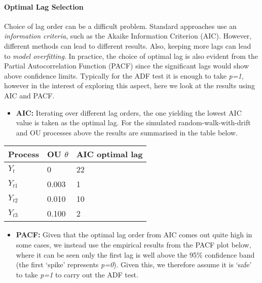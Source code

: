\documentclass[11pt]{article}
\providecommand{\tightlist}{%
      \setlength{\itemsep}{0pt}\setlength{\parskip}{0pt}}
\begin{document}
    \paragraph{Optimal Lag Selection}\label{optimal-lag-selection}
    
    
Choice of lag order can be a difficult problem. Standard approaches use
an \emph{information criteria}, such as the Akaike Information Criterion
(AIC). However, different methods can lead to different results. Also,
keeping more lags can lead to \emph{model overfitting}. In practice, the
choice of optimal lag is also evident from the
Partial Autocorrelation Function \cite{PartialAutocorrelationFunction} (PACF) since the significant lags would show
above confidence limits.
Typically for the ADF test it is enough to take \emph{p=1}, however in
the interest of exploring this aspect, here we look at the results using
AIC and PACF.
\begin{itemize}
\tightlist
\item
  \textbf{AIC:} Iterating over different lag orders, the one yielding
  the lowest AIC value is taken as the optimal lag. For the simulated
  random-walk-with-drift and OU processes above the results are
  summarised in the table below.
\end{itemize}
    \begin{longtable}[]{@{}lll@{}}
\toprule
Process & OU $\theta$ & AIC optimal lag\tabularnewline
\midrule
\endhead
$Y_{t}$ & 0 & 22\tabularnewline
$Y_{t1}$ & 0.003 & 1\tabularnewline
$Y_{t2}$ & 0.010 & 10\tabularnewline
$Y_{t3}$ & 0.100 & 2\tabularnewline
\bottomrule
\end{longtable}
    \begin{itemize}
\tightlist
\item
  \textbf{PACF:} Given that the optimal lag order from AIC comes out
  quite high in some cases, we instead use the
  empirical results from the PACF plot below, where it can be seen only the first lag is well above the 95\% confidence band (the
  first `spike' represents \emph{p=0}). Given this, we therefore assume
  it is `safe' to take \emph{p=1} to carry out the ADF test.
\end{itemize}
    \begin{center}
    \end{center}
    { \hspace*{\fill} \\}
    
\end{document}
